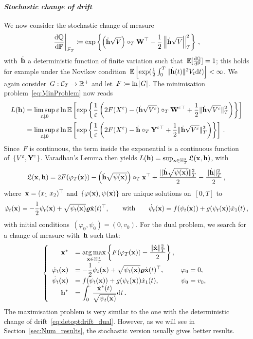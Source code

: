 \paragraph{\textit{Stochastic change of drift}}
We now consider the stochastic change of measure 
$$
\left.\frac{\D\QQ}{\D\PP}\right|_{\Ff_T} \defEqual \exp\left\{\left(\dot{\hh}\sqrt{V}\right)\cT \Wf^\top - \frac{1}{2}\left\|\dot{\hh}\sqrt{V}\right\|_{T}^2\right\}\,,
$$
with~$\dot{\hh}$ a deterministic function of finite variation such that~$\EE[\frac{\D\QQ}{\D \PP}]=1$;
this holds for example under the Novikov condition~$\EE\left [\exp(\frac{1}{2}\int_0^T \|\dot{\hh}(t)\|^2 V_t \D t)\right ]<\infty$. 
We again consider~$G:\Cc_T\rightarrow\nobreak\RR^+$ and let~$F\defEqual\ln|G|$. 
The minimisation problem~\eqref{eq:MinProblem} now reads
\begin{align*}
L(\hh) &=\limsup\limits_{\eps\downarrow 0}\eps
\ln\EE\left[\exp\left\{\frac{1}{\eps}\left(2F(X^{\eps}) - (\dot{\hh}\sqrt{V^{\eps}}) \cT \Wf^{\eps\top} + \frac{1}{2}\|\dot{\hh}\sqrt{V^\eps}\|_{T}^2\right)\right\}\right]\\
&= \limsup\limits_{\eps\downarrow 0}\eps\ln\EE\left[\exp\left\{\frac{1}{\eps}\left(2F(X^{\eps}) - \dot{\hh} \cT \Yf^{\eps\top} + \frac{1}{2}\|\dot{\hh}\sqrt{V^\eps}\|_{T}^2\right)\right\}\right]\,.
\end{align*}
Since~$F$ is continuous, the term inside the exponential is a continuous function of~$\{V^{\eps},\Yf^{\eps}\}$. 
Varadhan's Lemma then yields
$L(\hh) = \sup_{\xx\in \HH_T^0}\Lf(\xx,\hh)$,
with 
$$
\Lf(\xx,\hh) = 2F(\varphi_T(\xx)) - \left(\dot{\hh}\sqrt{\psi(\xx)}\right)\cT \xx^\top + \frac{\|\dot{\hh}\sqrt{\psi(\xx)}\|_{T}^2}{2} - \frac{\|\dot{\hh}\|_{T}^2}{2}\,,
$$
where~$\xx = (x_1 \; x_2)^\top$ and~$\{\varphi(\xx),\psi(\xx)\}$ are unique solutions on~$[0,T]$ to
$$
\dot{\varphi}_t(\xx) = -\frac{1}{2}\psi_t(\xx) + \sqrt{\psi_t(\xx)} \vrho\dot{\xx}(t)^\top,
\qquad\text{with}\qquad
\dot{\psi}_t(\xx) = f(\psi_t(\xx)) + g(\psi_t(\xx)) \dot{x}_1(t)\,,
$$
with initial conditions~$(\varphi_0,\psi_0) = (0,v_0)$. 
For  the dual problem, we search for a change of measure with~$\hh$ such that:
\begin{equation}\label{eq:detoptstochdrift_dual}
\left\{
\begin{array}{rll}
\xx^* & = \displaystyle \argmax\limits_{\xx\in \HH_T^0} 
\left\{F(\varphi_T(\xx)) - \frac{\|\dot{\xx}\|_{T}^2}{2}\right\},\\
\dot{\varphi}_t(\xx) & = \displaystyle -\frac{1}{2}\psi_t(\xx) + \sqrt{\psi_t(\xx)} \vrho \dot{\xx}(t)^\top, & \varphi_0 = 0,\\
\dot{\psi}_t(\xx) & = \displaystyle f(\psi_t(\xx)) + g(\psi_t(\xx)) \dot{x}_1(t), & \psi_0 = v_0,\\
\hh^* & = \displaystyle \int_{0}^{\cdot}\frac{\dot{\xx}^*(t)}{\sqrt{\psi_t(\xx)}}\D t\,.
\end{array}
\right.
\end{equation}
The maximisation problem is very similar to the one with the deterministic change of drift~\eqref{eq:detoptdrift_dual}. 
However, as we will see in Section~\ref{sec:Num_results}, the stochastic version usually gives better results.

